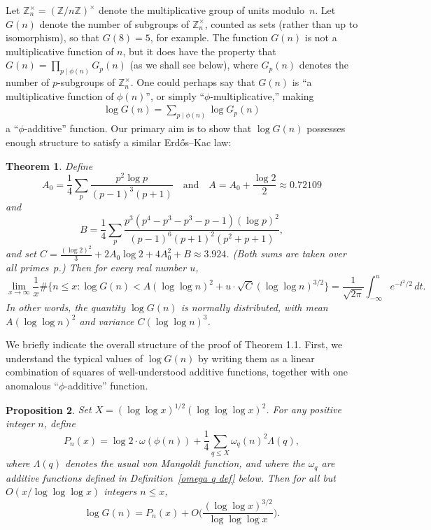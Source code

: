 \documentclass[12pt,reqno]{amsart}
\newtheorem{theorem}{Theorem}[section]
\newtheorem{prop}[theorem]{Proposition}
\theoremstyle{definition}
\newcommand{\Z}{{\mathbb Z}}
\newcommand{\Znt}{{\Z_n^\times}}
\begin{document}
Let $\Znt = (\Z/n\Z)^\times$ denote the multiplicative group of units modulo~$n$.
Let $G(n)$ denote the number of subgroups of $\Znt$, counted as sets (rather than up to isomorphism), so that $G(8) = 5$, for example. The function $G(n)$ is not a multiplicative function of $n$, but it does have the property that $G(n) = \prod_{p \mid \phi(n)} G_p(n)$ (as we shall see below), where $G_p(n)$ denotes the number of $p$-subgroups of $\Znt$. One could perhaps say that $G(n)$ is ``a multiplicative function of $\phi(n)$'', or simply ``$\phi$-multiplicative,'' making
\begin{align}\label{phi additive}
\log G(n) = \sum_{p \mid \phi(n)} \log G_p(n)
\end{align}
a ``$\phi$-additive'' function. Our primary aim is to show that $\log G(n)$ possesses enough structure to satisfy a similar Erd{\H o}s--Kac law:

\begin{theorem}\label{main theorem}
Define
\[
A_0 = \frac{1}{4} \sum_{p} \frac{p^2 \log p}{(p - 1)^3(p + 1)} \quad\text{and}\quad A = A_0 + \frac{\log2}2 \approx 0.72109
\]
and
\[
B = \frac14 \sum_p \frac{p^3(p^4 - p^3 - p^3 - p - 1)(\log p)^2}{(p - 1)^6(p + 1)^2(p^2 + p + 1)}, %
\]
and set $C = \frac{(\log 2)^2}{3} + 2 A_0 \log 2 + 4A_0^2 + B \approx 3.924$. (Both sums are taken over all primes~$p$.) Then for every real number $u$,
\begin{equation*}
\lim_{x \to \infty} \frac{1}{x} \#\big\{n \leq x \colon \log G(n) < A(\log\log n)^2 + u\cdot \sqrt C(\log\log n)^{3/2} \big\} = \frac{1}{\sqrt{2\pi}} \int_{-\infty}^u e^{-t^2/2} \, dt.
\end{equation*}
In other words, the quantity $\log G(n)$ is normally distributed, with mean $A (\log\log n)^2$ and variance $C(\log\log n)^3$.
\end{theorem}

We briefly indicate the overall structure of the proof of Theorem 1.1. First, we understand the typical values of $\log G(n)$ by writing them as a linear combination of squares of well-understood additive functions, together with one anomalous ``$\phi$-additive'' function.

\begin{prop}\label{log G as a polynomial intro version}
Set $X = (\log\log x)^{1/2}(\log\log\log x)^{2}$. For any positive integer $n$, define
\begin{equation}  \label{Qnx definition}
P_n(x) = \log 2 \cdot \omega(\phi(n)) + \frac{1}{4} \sum_{q \leq X} \omega_q(n)^2 \Lambda(q),
\end{equation}
where $\Lambda(q)$ denotes the usual von Mangoldt function, and where the $\omega_q$ are additive functions defined in Definition~\ref{omega q def} below.
Then for all but $O(x/\log\log\log x)$ integers $n\le x$,
\begin{equation} \label{log gn as a polynomial intro version}
\log G(n) = P_n(x) + O\bigg(\frac{(\log\log x)^{3/2}}{\log\log\log x}\bigg).
\end{equation}
\end{prop}
\end{document}
